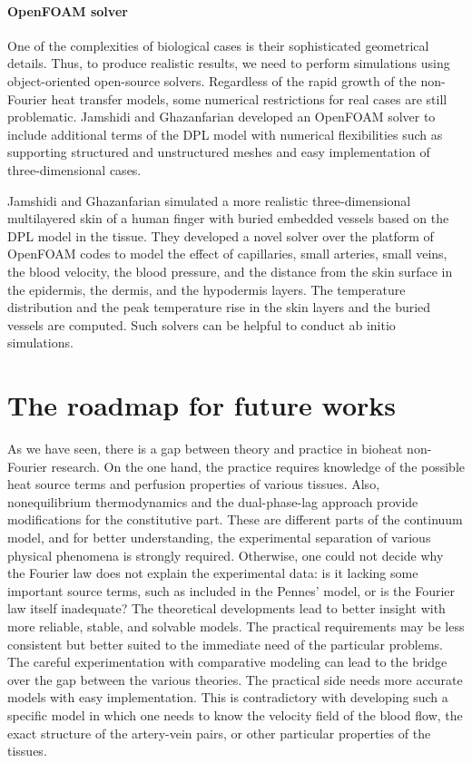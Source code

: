 \documentclass[sn-mathphys]{sn-jnl}%
\theoremstyle{thmstyleone}%
\theoremstyle{thmstyletwo}%
\theoremstyle{thmstylethree}%
\begin{document}
\paragraph{OpenFOAM solver}
One of the complexities of biological cases is their sophisticated geometrical details. Thus, to produce realistic results, we need to perform simulations using object-oriented open-source solvers. Regardless of the rapid growth of the non-Fourier heat transfer models, some numerical restrictions for real cases are still problematic. Jamshidi and Ghazanfarian \cite{MJamshidi2017,MJamshidi20182} developed an OpenFOAM solver to include additional terms of the DPL model with numerical flexibilities such as supporting structured and unstructured meshes and easy implementation of three-dimensional cases. 

Jamshidi and Ghazanfarian \cite{MJamshidi2020} simulated a more realistic three-dimensional multilayered skin of a human finger with buried embedded vessels based on the DPL model in the tissue. They developed a novel solver over the platform of OpenFOAM codes to model the effect of capillaries, small arteries, small veins, the blood velocity, the blood pressure, and the distance from the skin surface in the epidermis, the dermis, and the hypodermis layers. The temperature distribution and the peak temperature rise in the skin layers and the buried vessels are computed. Such solvers can be helpful to conduct ab initio simulations.

\section{The roadmap for future works}
As we have seen, there is a gap between theory and practice in bioheat non-Fourier research. On the one hand, the practice requires knowledge of the possible heat source terms and perfusion properties of various tissues. Also, nonequilibrium thermodynamics and the dual-phase-lag approach provide modifications for the constitutive part. These are different parts of the continuum model, and for better understanding, the experimental separation of various physical phenomena is strongly required. Otherwise, one could not decide why the Fourier law does not explain the experimental data: is it lacking some important source terms, such as included in the Pennes' model, or is the Fourier law itself inadequate?
The theoretical developments lead to better insight with more reliable, stable, and solvable models. The practical requirements may be less consistent but better suited to the immediate need of the particular problems. The careful experimentation with comparative modeling can lead to the bridge over the gap between the various theories. The practical side needs more accurate models with easy implementation. This is contradictory with developing such a specific model in which one needs to know the velocity field of the blood flow, the exact structure of the artery-vein pairs, or other particular properties of the tissues.
\end{document}
